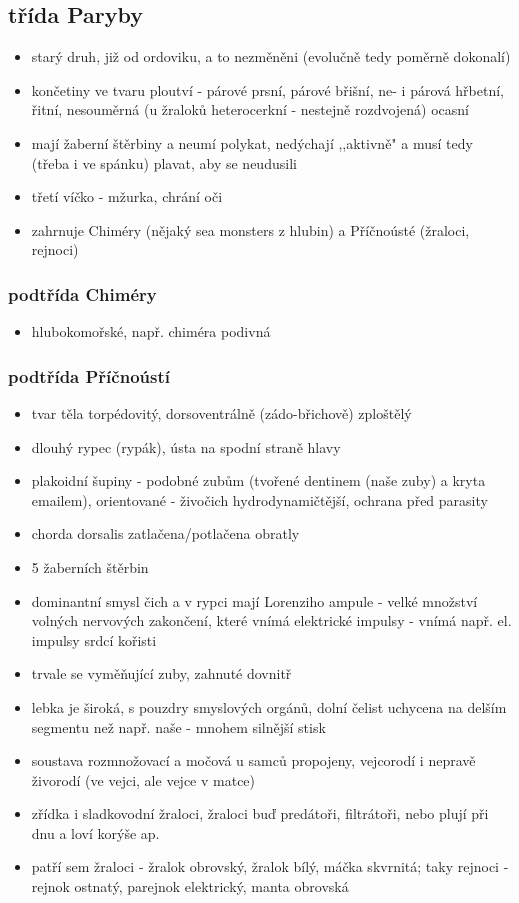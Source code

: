 \documentclass{article}
\begin{document}
\subsection{třída Paryby}
\begin{itemize}
  \item starý druh, již od ordoviku, a to nezměněni (evolučně tedy poměrně dokonalí)
  \item končetiny ve tvaru ploutví - párové prsní, párové břišní, ne- i párová hřbetní, řitní, nesouměrná (u žraloků heterocerkní - nestejně rozdvojená) ocasní
  \item mají žaberní štěrbiny a neumí polykat, nedýchají ,,aktivně" a musí tedy (třeba i ve spánku) plavat, aby se neudusili
  \item třetí víčko - mžurka, chrání oči
  \item zahrnuje Chiméry (nějaký sea monsters z hlubin) a Příčnoústé (žraloci, rejnoci)
\end{itemize}

\subsubsection{podtřída Chiméry}
\begin{itemize}
  \item hlubokomořské, např. chiméra podivná
\end{itemize}

\subsubsection{podtřída Příčnoústí}
\begin{itemize}
  \item tvar těla torpédovitý, dorsoventrálně (zádo-břichově) zploštělý
  \item dlouhý rypec (rypák), ústa na spodní straně hlavy
  \item plakoidní šupiny - podobné zubům (tvořené dentinem (naše zuby) a kryta emailem), orientované - živočich hydrodynamičtější, ochrana před parasity
  \item chorda dorsalis zatlačena/potlačena obratly
  \item 5 žaberních štěrbin
  \item dominantní smysl čich a v rypci mají Lorenziho ampule - velké množství volných nervových zakončení, které vnímá elektrické impulsy - vnímá např. el. impulsy srdcí kořisti
  \item trvale se vyměňující zuby, zahnuté dovnitř
  \item lebka je široká, s pouzdry smyslových orgánů, dolní čelist uchycena na delším segmentu než např. naše - mnohem silnější stisk
  \item soustava rozmnožovací a močová u samců propojeny, vejcorodí i nepravě živorodí (ve vejci, ale vejce v matce)
  \item zřídka i sladkovodní žraloci, žraloci buď predátoři, filtrátoři, nebo plují při dnu a loví korýše ap.
  \item patří sem žraloci - žralok obrovský, žralok bílý, máčka skvrnitá; taky rejnoci - rejnok ostnatý, parejnok elektrický, manta obrovská
\end{itemize}
\end{document}
